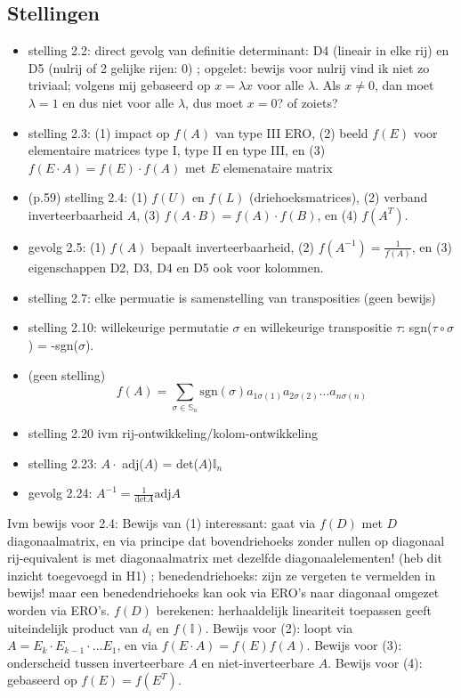 \documentclass{article}
\begin{document}
\subsection{Stellingen}
\begin{itemize}
    \item stelling 2.2: direct gevolg van definitie determinant: D4 (lineair in elke rij) en D5 (nulrij of 2 gelijke rijen: 0) ; opgelet: bewijs voor nulrij vind ik niet zo triviaal; volgens mij gebaseerd op $x = \lambda x$ voor alle $\lambda$. Als $x \neq 0$, dan moet $\lambda=1$ en dus niet voor alle $\lambda$, dus moet $x=0$? of zoiets? 
    \item stelling 2.3: (1) impact op $f(A)$ van type III ERO, (2) beeld $f(E)$ voor elementaire matrices type I, type II en type III, en (3) $f(E\cdot A)= f(E)\cdot f(A)$ met $E$ elemenataire matrix
    \item (p.59) stelling 2.4: (1) $f(U)$ en $f(L)$ (driehoeksmatrices), (2) verband inverteerbaarheid $A$, (3) $f(A\cdot B) = f(A) \cdot f(B)$, en (4) $f(A^T)$.  
    \item gevolg 2.5: (1) $f(A)$ bepaalt inverteerbaarheid, (2) $f(A^{-1}) = \frac{1}{f(A)}$, en (3) eigenschappen D2, D3, D4 en D5 ook voor kolommen. 
    \item stelling 2.7: elke permuatie is samenstelling van transposities (geen bewijs) 
    \item stelling 2.10: willekeurige permutatie $\sigma$ en willekeurige transpositie $\tau$: sgn($\tau\circ\sigma$) = -sgn($ \sigma$). 
    \item (geen stelling) \[ f(A) = \sum_{\sigma \in \mathbb{S}_n} \text{sgn} (\sigma) a_{1\sigma(1)} a_{2\sigma(2)} ... a_{n \sigma(n)} \] 
    \item stelling 2.20 ivm rij-ontwikkeling/kolom-ontwikkeling
    \item stelling 2.23: $A\cdot$ adj($A$) = det($A$)$\mathbb{I}_n$
    \item gevolg 2.24: $A^{-1} = \frac{1}{\text{det}A} \text{adj}A$
\end{itemize}

Ivm bewijs voor 2.4: Bewijs van (1) interessant: gaat via $f(D)$ met $D$ diagonaalmatrix, en via principe dat bovendriehoeks zonder nullen op diagonaal rij-equivalent is met diagonaalmatrix met dezelfde diagonaalelementen! (heb dit inzicht toegevoegd in H1) ; benedendriehoeks: zijn ze vergeten te vermelden in bewijs! maar een benedendriehoeks kan ook via ERO's naar diagonaal omgezet worden via ERO's. $f(D)$ berekenen: herhaaldelijk lineariteit toepassen geeft uiteindelijk product van $d_i$ en $f(\mathbb{I})$. Bewijs voor (2): loopt via $A = E_k \cdot E_{k-1} \cdot ... E_1$, en via $f(E\cdot A) = f(E)f(A)$. Bewijs voor (3): onderscheid tussen inverteerbare $A$ en niet-inverteerbare $A$. Bewijs voor (4): gebaseerd op $f(E)=f(E^T)$. 
\end{document}
